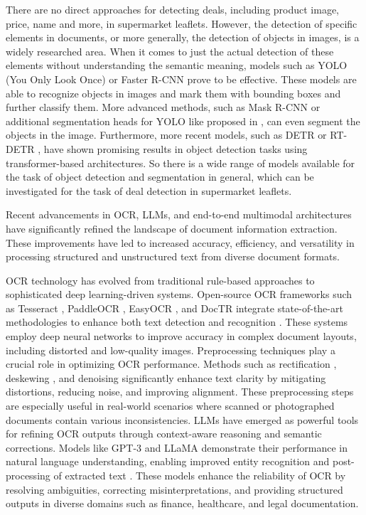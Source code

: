 \documentclass[11pt]{article}
\begin{document}
There are no direct approaches for detecting deals, including product image, price, name and more, in supermarket leaflets. However, the detection of specific elements in documents, or more generally, the detection of objects in images, is a widely researched area. When it comes to just the actual detection of these elements without understanding the semantic meaning, models such as YOLO (You Only Look Once) \cite{redmonYouOnlyLook2016} or Faster R-CNN \cite{renFasterRCNNRealTime2016} prove to be effective. These models are able to recognize objects in images and mark them with bounding boxes and further classify them. More advanced methods, such as Mask R-CNN \cite{heMaskRCNN2018} or additional segmentation heads for YOLO like proposed in \cite{mohamedINSTAYOLORealTimeInstance2024}, can even segment the objects in the image. Furthermore, more recent models, such as DETR \cite{zhuDeformableDETRDeformable2021} or RT-DETR \cite{zhaoDETRsBeatYOLOs2024a}, have shown promising results in object detection tasks using transformer-based architectures. So there is a wide range of models available for the task of object detection and segmentation in general, which can be investigated for the task of deal detection in supermarket leaflets.

Recent advancements in OCR, LLMs, and end-to-end multimodal architectures have significantly refined the landscape of document information extraction. These improvements have led to increased accuracy, efficiency, and versatility in processing structured and unstructured text from diverse document formats.

OCR technology has evolved from traditional rule-based approaches to sophisticated deep learning-driven systems. Open-source OCR frameworks such as Tesseract \cite{tesseract}, PaddleOCR \cite{ppocrv2}, EasyOCR \cite{easyocr}, and DocTR \cite{doctr} integrate state-of-the-art methodologies to enhance both text detection \cite{liao2019, liao2022} and recognition \cite{shi2015, li2022}. These systems employ deep neural networks to improve accuracy in complex document layouts, including distorted and low-quality images. Preprocessing techniques play a crucial role in optimizing OCR performance. Methods such as rectification \cite{shi2019}, deskewing \cite{pham2022}, and denoising \cite{zhao2018} significantly enhance text clarity by mitigating distortions, reducing noise, and improving alignment. These preprocessing steps are especially useful in real-world scenarios where scanned or photographed documents contain various inconsistencies. LLMs have emerged as powerful tools for refining OCR outputs through context-aware reasoning and semantic corrections. Models like GPT-3 \cite{brown2020} and LLaMA \cite{touvron2023} demonstrate their performance in natural language understanding, enabling improved entity recognition and post-processing of extracted text \cite{yenduri2023}. These models enhance the reliability of OCR by resolving ambiguities, correcting misinterpretations, and providing structured outputs in diverse domains such as finance, healthcare, and legal documentation.
\end{document}
